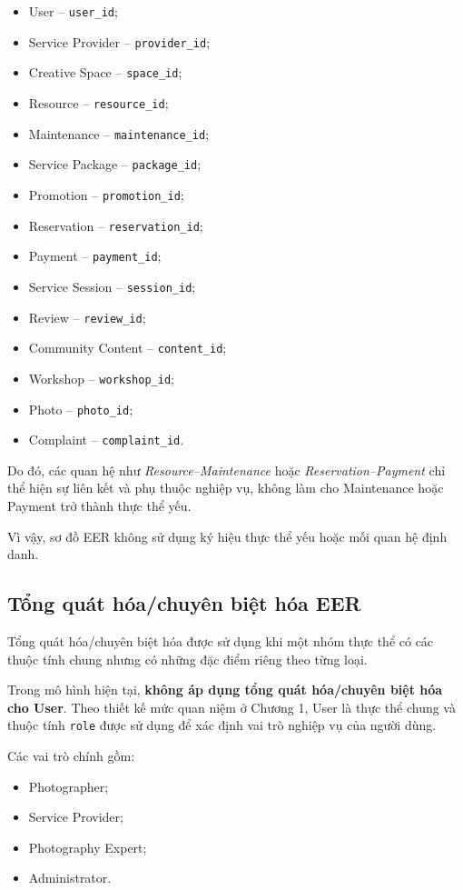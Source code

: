 \begin{itemize}
	\item User -- \texttt{user\_id};
	\item Service Provider -- \texttt{provider\_id};
	\item Creative Space -- \texttt{space\_id};
	\item Resource -- \texttt{resource\_id};
	\item Maintenance -- \texttt{maintenance\_id};
	\item Service Package -- \texttt{package\_id};
	\item Promotion -- \texttt{promotion\_id};
	\item Reservation -- \texttt{reservation\_id};
	\item Payment -- \texttt{payment\_id};
	\item Service Session -- \texttt{session\_id};
	\item Review -- \texttt{review\_id};
	\item Community Content -- \texttt{content\_id};
	\item Workshop -- \texttt{workshop\_id};
	\item Photo -- \texttt{photo\_id};
	\item Complaint -- \texttt{complaint\_id}.
\end{itemize}

Do đó, các quan hệ như \textit{Resource--Maintenance} hoặc \textit{Reservation--Payment} chỉ thể hiện sự liên kết và phụ thuộc nghiệp vụ, không làm cho Maintenance hoặc Payment trở thành thực thể yếu.

Vì vậy, sơ đồ EER không sử dụng ký hiệu thực thể yếu hoặc mối quan hệ định danh.

\subsection{Tổng quát hóa/chuyên biệt hóa EER}
\label{sec:eer_generalization}

Tổng quát hóa/chuyên biệt hóa được sử dụng khi một nhóm thực thể có các thuộc tính chung nhưng có những đặc điểm riêng theo từng loại.

Trong mô hình hiện tại, \textbf{không áp dụng tổng quát hóa/chuyên biệt hóa cho User}. Theo thiết kế mức quan niệm ở Chương 1, User là thực thể chung và thuộc tính \texttt{role} được sử dụng để xác định vai trò nghiệp vụ của người dùng.

Các vai trò chính gồm:

\begin{itemize}
	\item Photographer;
	\item Service Provider;
	\item Photography Expert;
	\item Administrator.
\end{itemize}

